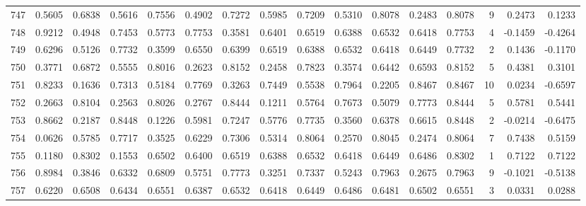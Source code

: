 \begin{tabular}{lrrrrrrrrrrrrrrr}
747 &      0.5605 &  0.6838 &  0.5616 &  0.7556 &  0.4902 &  0.7272 &  0.5985 &  0.7209 &  0.5310 &  0.8078 &   0.2483 &     0.8078 &      9 &                    0.2473 &                     0.1233 \\
748 &      0.9212 &  0.4948 &  0.7453 &  0.5773 &  0.7753 &  0.3581 &  0.6401 &  0.6519 &  0.6388 &  0.6532 &   0.6418 &     0.7753 &      4 &                   -0.1459 &                    -0.4264 \\
749 &      0.6296 &  0.5126 &  0.7732 &  0.3599 &  0.6550 &  0.6399 &  0.6519 &  0.6388 &  0.6532 &  0.6418 &   0.6449 &     0.7732 &      2 &                    0.1436 &                    -0.1170 \\
750 &      0.3771 &  0.6872 &  0.5555 &  0.8016 &  0.2623 &  0.8152 &  0.2458 &  0.7823 &  0.3574 &  0.6442 &   0.6593 &     0.8152 &      5 &                    0.4381 &                     0.3101 \\
751 &      0.8233 &  0.1636 &  0.7313 &  0.5184 &  0.7769 &  0.3263 &  0.7449 &  0.5538 &  0.7964 &  0.2205 &   0.8467 &     0.8467 &     10 &                    0.0234 &                    -0.6597 \\
752 &      0.2663 &  0.8104 &  0.2563 &  0.8026 &  0.2767 &  0.8444 &  0.1211 &  0.5764 &  0.7673 &  0.5079 &   0.7773 &     0.8444 &      5 &                    0.5781 &                     0.5441 \\
753 &      0.8662 &  0.2187 &  0.8448 &  0.1226 &  0.5981 &  0.7247 &  0.5776 &  0.7735 &  0.3560 &  0.6378 &   0.6615 &     0.8448 &      2 &                   -0.0214 &                    -0.6475 \\
754 &      0.0626 &  0.5785 &  0.7717 &  0.3525 &  0.6229 &  0.7306 &  0.5314 &  0.8064 &  0.2570 &  0.8045 &   0.2474 &     0.8064 &      7 &                    0.7438 &                     0.5159 \\
755 &      0.1180 &  0.8302 &  0.1553 &  0.6502 &  0.6400 &  0.6519 &  0.6388 &  0.6532 &  0.6418 &  0.6449 &   0.6486 &     0.8302 &      1 &                    0.7122 &                     0.7122 \\
756 &      0.8984 &  0.3846 &  0.6332 &  0.6809 &  0.5751 &  0.7773 &  0.3251 &  0.7337 &  0.5243 &  0.7963 &   0.2675 &     0.7963 &      9 &                   -0.1021 &                    -0.5138 \\
757 &      0.6220 &  0.6508 &  0.6434 &  0.6551 &  0.6387 &  0.6532 &  0.6418 &  0.6449 &  0.6486 &  0.6481 &   0.6502 &     0.6551 &      3 &                    0.0331 &                     0.0288 \\

\end{tabular}
